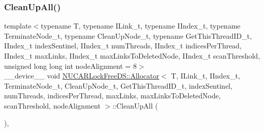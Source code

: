 \subsubsection{\texorpdfstring{Clean\+Up\+All()}{CleanUpAll()}}
{\footnotesize\ttfamily template$<$typename T, typename I\+Link\+\_\+t, typename I\+Index\+\_\+t, typename Terminate\+Node\+\_\+t, typename Clean\+Up\+Node\+\_\+t, typename Get\+This\+Thread\+I\+D\+\_\+t, I\+Index\+\_\+t index\+Sentinel, I\+Index\+\_\+t num\+Threads, I\+Index\+\_\+t indices\+Per\+Thread, I\+Index\+\_\+t max\+Links, I\+Index\+\_\+t max\+Links\+To\+Deleted\+Node, I\+Index\+\_\+t scan\+Threshold, unsigned long long int node\+Alignment = 8$>$ \\
\+\_\+\+\_\+device\+\_\+\+\_\+ void \mbox{\hyperlink{class_n_u_c_a_r_lock_free_d_s_1_1_allocator}{N\+U\+C\+A\+R\+Lock\+Free\+D\+S\+::\+Allocator}}$<$ T, I\+Link\+\_\+t, I\+Index\+\_\+t, Terminate\+Node\+\_\+t, Clean\+Up\+Node\+\_\+t, Get\+This\+Thread\+I\+D\+\_\+t, index\+Sentinel, num\+Threads, indices\+Per\+Thread, max\+Links, max\+Links\+To\+Deleted\+Node, scan\+Threshold, node\+Alignment $>$\+::Clean\+Up\+All (\begin{DoxyParamCaption}{ }\end{DoxyParamCaption})\hspace{0.3cm}{\ttfamily [inline]}, {\ttfamily [private]}}

\mbox{\label{class_n_u_c_a_r_lock_free_d_s_1_1_allocator_afdfba24913e993f6572d4a5b0f6c701c}} 
